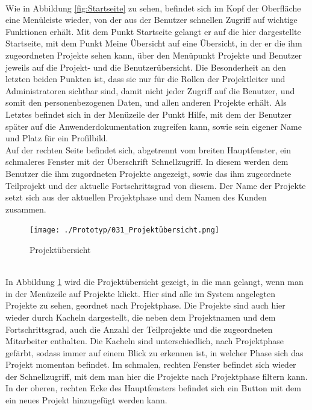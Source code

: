 \\Wie in Abbildung \ref{fig:Startseite} zu sehen, befindet sich im Kopf der Oberfläche eine Menüleiste wieder, von der aus der Benutzer schnellen Zugriff auf wichtige Funktionen erhält. Mit dem Punkt \glqq{}Startseite\grqq{} gelangt er auf die hier dargestellte Startseite, mit dem Punkt \glqq{}Meine Übersicht\grqq{} auf eine Übersicht, in der er die ihm zugeordneten Projekte sehen kann, über den Menüpunkt \glqq{}Projekte\grqq{} und \glqq{}Benutzer\grqq{} jeweils auf die Projekt- und die Benutzerübersicht. Die Besonderheit an den letzten beiden Punkten ist, dass sie nur für die Rollen der Projektleiter und Administratoren sichtbar sind, damit nicht jeder Zugriff auf die Benutzer, und somit den personenbezogenen Daten, und allen anderen Projekte erhält. Als Letztes befindet sich in der Menüzeile der Punkt \glqq{}Hilfe\grqq{}, mit dem der Benutzer später auf die Anwenderdokumentation zugreifen kann, sowie sein eigener Name und Platz für ein Profilbild.\\Auf der rechten Seite befindet sich, abgetrennt vom breiten Hauptfenster, ein schmaleres Fenster mit der Überschrift Schnellzugriff. In diesem werden dem Benutzer die ihm zugordneten Projekte angezeigt, sowie das ihm zugeordnete Teilprojekt und der aktuelle Fortschrittsgrad von diesem. Der Name der Projekte setzt sich aus der aktuellen Projektphase und dem Namen des Kunden zusammen.
\begin{figure}[h!]
    \centering
    \texttt{[image: ./Prototyp/031\_Projektübersicht.png]}
    \caption[Prototyp: Projektübersicht]{Projektübersicht}
    \label{fig:Projektübersicht}
\end{figure}
\\In Abbildung \ref{fig:Projektübersicht} wird die Projektübersicht gezeigt, in die man gelangt, wenn man in der Menüzeile auf \glqq{}Projekte\grqq{} klickt. Hier sind alle im System angelegten Projekte zu sehen, geordnet nach Projektphase. Die Projekte sind auch hier wieder durch Kacheln dargestellt, die neben dem Projektnamen und dem Fortschrittsgrad, auch die Anzahl der Teilprojekte und die zugeordneten Mitarbeiter enthalten. Die Kacheln sind unterschiedlich, nach Projektphase gefärbt, sodass immer auf einem Blick zu erkennen ist, in welcher Phase sich das Projekt momentan befindet. Im schmalen, rechten Fenster befindet sich wieder der Schnellzugriff, mit dem man hier die Projekte nach Projektphase filtern kann. In der oberen, rechten Ecke des Hauptfensters befindet sich ein Button mit dem ein neues Projekt hinzugefügt werden kann.
